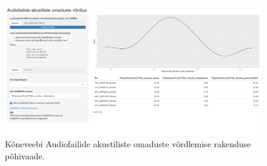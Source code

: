 \begin{figure}[H]
    \centering
    \includegraphics[width=\textwidth]{figures/alt-kõneveeb-põhivaade.png}
    \caption{Kõneveebi Audiofailide akustiliste omaduste võrdlemise rakenduse põhivaade.}
    \label{fig:alt-kõneveeb-põhivaade}
\end{figure}


